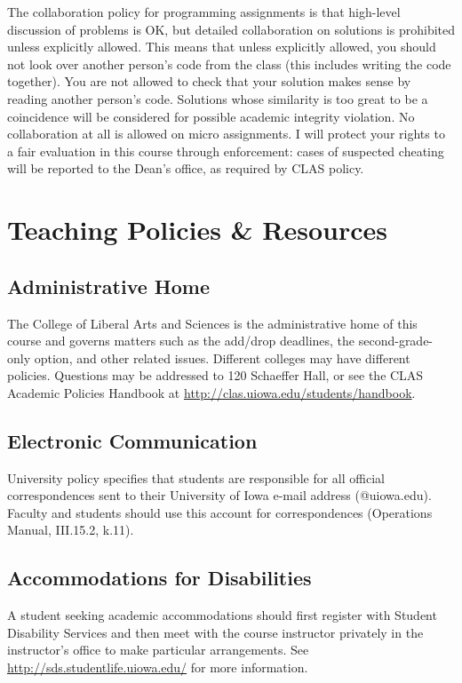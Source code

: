 \documentclass[10pt]{article}
\begin{document}
The collaboration policy for programming assignments is that high-level
discussion of problems is OK, but detailed collaboration on solutions is
prohibited unless explicitly allowed. This means that unless explicitly
allowed, you should not look over another person's code from the class (this
includes writing the code together). You are not allowed to check that your
solution makes sense by reading another person's code. Solutions whose
similarity is too great to be a coincidence will be considered for possible
academic integrity violation. No collaboration at all is allowed on micro
assignments. I will protect your rights to a fair evaluation in this course
through enforcement: cases of suspected cheating will be reported to the Dean's
office, as required by CLAS policy.


\section*{Teaching Policies \& Resources}

\subsection*{Administrative Home}
The College of Liberal Arts and Sciences is the administrative home of this
course and governs matters such as the add/drop deadlines, the
second-grade-only option, and other related issues. Different colleges may have
different policies. Questions may be addressed to 120 Schaeffer Hall, or see
the CLAS Academic Policies Handbook at
\url{http://clas.uiowa.edu/students/handbook}.

\subsection*{Electronic Communication}
University policy specifies that students are responsible for all official
correspondences sent to their University of Iowa e-mail address (@uiowa.edu).
Faculty and students should use this account for correspondences (Operations
Manual, III.15.2, k.11).

\subsection*{Accommodations for Disabilities}
A student seeking academic accommodations should first register with Student
Disability Services and then meet with the course instructor privately in the
instructor's office to make particular arrangements. See
\url{http://sds.studentlife.uiowa.edu/} for more information.
\end{document}
